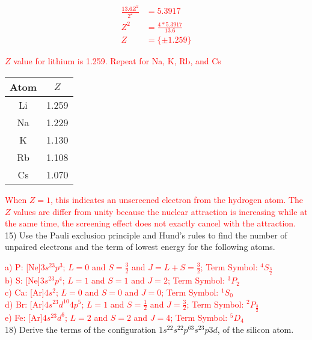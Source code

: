 \documentclass{article}
\begin{document}
\textcolor{red}{
\begin{align*}
  \frac{13.6 Z^2}{2^2} & = 5.3917 \\
  Z^2 & = \frac{4*5.3917}{13.6} \\
  Z  & = \{\pm 1.259\}
\end{align*}
}

\textcolor{red}{$Z$ value for lithium is 1.259. Repeat for Na, K, Rb, and Cs}

\begin{table}[hbpt]
  \centering
  \begin{tabular}{cc}
    Atom & $Z$ \\
    \hline
    Li & 1.259 \\
    Na & 1.229\\
    K  & 1.130 \\
    Rb & 1.108 \\
    Cs & 1.070
  \end{tabular}
\end{table}

\textcolor{red}{When $Z=1$, this indicates an unscreened electron from the
  hydrogen atom. The $Z$ values are differ from unity because the nuclear attraction
  is increasing while at the same time, the screening effect does not exactly
  cancel with the attraction.}
\\

15) Use the Pauli exclusion principle and Hund's rules to find the number
of unpaired electrons and the term of lowest energy for the following atoms.

\textcolor{red}{a) P: [Ne]$3s^23p^3$; $L=0$ and $S=\frac{3}{2}$ and $J=L+S=\frac{3}{2}$;
  Term Symbol: $^4S_{\frac{3}{2}}$}
\\

\textcolor{red}{b) S: [Ne]$3s^23p^4$; $L=1$ and $S=1$ and $J=2$;
  Term Symbol: $^3P_2$}
\\

\textcolor{red}{c) Ca: [Ar]$4s^2$; $L=0$ and $S=0$ and $J=0$;
  Term Symbol: $^1S_0$}
\\

\textcolor{red}{d) Br: [Ar]$4s^23d^{10}4p^5$; $L=1$ and $S=\frac{1}{2}$
  and $J=\frac{3}{2}$; Term Symbol: $^2P_{\frac{3}{2}}$}
\\

\textcolor{red}{e) Fe: [Ar]$4s^23d^6$; $L=2$ and $S=2$ and $J=4$;
  Term Symbol: $^5D_4$}
\\

18) Derive the terms of the configuration $1s^22s^22p^63s^23p3d$,
of the silicon atom.
\end{document}
